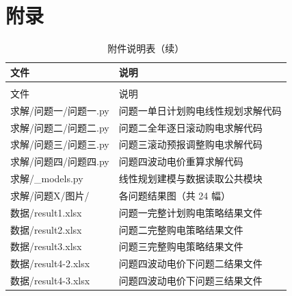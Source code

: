 
\newpage
\makeatletter
\let\@oldaddcontentsline\addcontentsline
\renewcommand{\addcontentsline}[3]{}

\section*{附录}
\let\addcontentsline\@oldaddcontentsline
\makeatother

\renewcommand{\arraystretch}{1.2}
\begin{longtable}{>{\centering\arraybackslash}p{}>{\raggedright\arraybackslash}p{}}
  \caption{附件说明表}
  \label{tab:appendix} \\
  \toprule
  文件 & 说明 \\
  \midrule
  \endfirsthead
  \caption{附件说明表（续）} \\
  \toprule
  文件 & 说明 \\
  \midrule
  \endhead
  \bottomrule
  \endfoot
  求解/问题一/问题一.py & 问题一单日计划购电线性规划求解代码 \\
  求解/问题二/问题二.py & 问题二全年逐日滚动购电求解代码 \\
  求解/问题三/问题三.py & 问题三滚动预报调整购电求解代码 \\
  求解/问题四/问题四.py & 问题四波动电价重算求解代码 \\
  求解/\_models.py & 线性规划建模与数据读取公共模块 \\
  求解/问题X/图片/ & 各问题结果图（共 24 幅） \\
  数据/result1.xlsx & 问题一完整计划购电策略结果文件 \\
  数据/result2.xlsx & 问题二完整购电策略结果文件 \\
  数据/result3.xlsx & 问题三完整购电策略结果文件 \\
  数据/result4-2.xlsx & 问题四波动电价下问题二结果文件 \\
  数据/result4-3.xlsx & 问题四波动电价下问题三结果文件 \\
\end{longtable}
